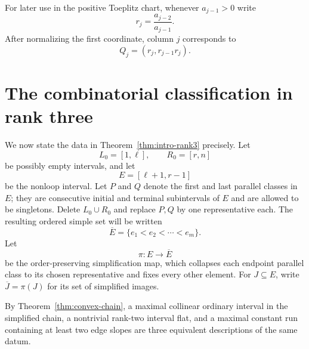 \documentclass{amsart}
\numberwithin{equation}{section}
\theoremstyle{definition}
\theoremstyle{remark}
\begin{document}
For later use in the positive Toeplitz chart, whenever $a_{j-1}>0$ write
\begin{equation}\label{eq:rdef}
 r_j=\frac{a_{j-2}}{a_{j-1}}.
\end{equation}
After normalizing the first coordinate, column $j$ corresponds to
\begin{equation}\label{eq:rpoint}
 Q_j=(r_j,r_{j-1}r_j).
\end{equation}

\section{The combinatorial classification in rank three}

We now state the data in Theorem~\ref{thm:intro-rank3} precisely.  Let
\begin{equation}\label{eq:loops}
 L_0=[1,\ell],
 \qquad
 R_0=[r,n]
\end{equation}
be possibly empty intervals, and let
\begin{equation}\label{eq:nonloops}
 E=[\ell+1,r-1]
\end{equation}
be the nonloop interval.  Let $P$ and $Q$ denote the first and last parallel classes in $E$; they are consecutive initial and terminal subintervals of $E$ and are allowed to be singletons.  Delete $L_0\cup R_0$ and replace $P,Q$ by one representative each.  The resulting ordered simple set will be written
\begin{equation}\label{eq:simpleE}
 \overline E=\{e_1<e_2<\cdots<e_m\}.
\end{equation}
Let
\[
 \pi:E\longrightarrow\overline E
\]
be the order-preserving simplification map, which collapses each endpoint parallel class to its chosen representative and fixes every other element.  For $J\subseteq E$, write $\overline J=\pi(J)$ for its set of simplified images.

By Theorem~\ref{thm:convex-chain}, a maximal collinear ordinary interval in the simplified chain, a nontrivial rank-two interval flat, and a maximal constant run containing at least two edge slopes are three equivalent descriptions of the same datum.
\end{document}
